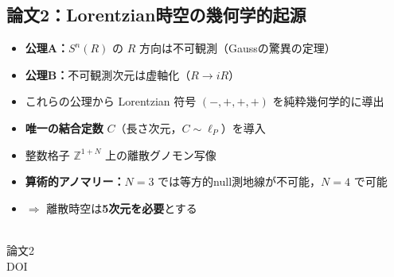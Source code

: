 \documentclass[11pt,a4paper]{ltjsarticle}
\begin{document}
\vspace{10pt}

\noindent\begin{minipage}[t]{0.82\textwidth}
\subsection*{論文2：Lorentzian時空の幾何学的起源}
\vspace{-6pt}
\begin{itemize}
\item \textbf{公理A：}$S^n(R)$ の $R$ 方向は不可観測（Gaussの驚異の定理）
\item \textbf{公理B：}不可観測次元は虚軸化（$R \to iR$）
\item これらの公理から Lorentzian 符号 $(-,+,+,+)$ を純粋幾何学的に導出
\item \textbf{唯一の結合定数} $C$（長さ次元，$C \sim \ell_P$）を導入
\item 整数格子 $\mathbb{Z}^{1+N}$ 上の離散グノモン写像
\item \textbf{算術的アノマリー：}$N=3$ では等方的null測地線が不可能，$N=4$ で可能
\item $\Longrightarrow$ 離散時空は\textbf{5次元を必要}とする
\end{itemize}
\end{minipage}%
\hfill
\begin{minipage}[t]{0.15\textwidth}
\vspace{0pt}
\centering
{}\\[3pt]
{\scriptsize 論文2\\DOI}
\end{minipage}

\vspace{10pt}
\end{document}

